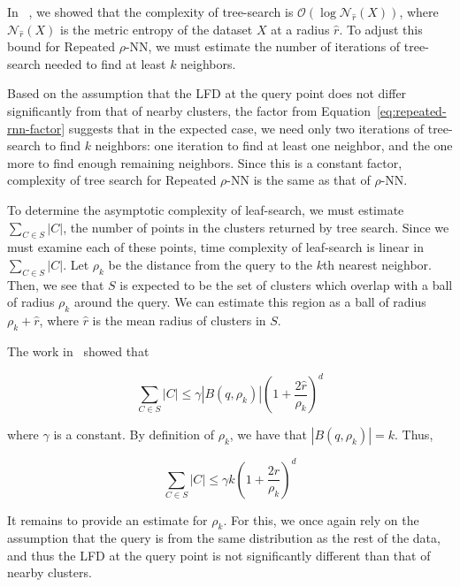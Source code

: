 In ~\cite{ishaq2019clustered}, we showed that the complexity of tree-search is $\mathcal{O}(\log\mathcal{N}_{\hat{r}}(X))$, where $\mathcal{N}_{\hat{r}}(X)$ is the metric entropy of the dataset $X$ at a radius $\hat{r}$.
To adjust this bound for Repeated $\rho$-NN, we must estimate the number of iterations of tree-search needed to find at least $k$ neighbors.

Based on the assumption that the LFD at the query point does not differ significantly from that of nearby clusters, the factor from Equation~\ref{eq:repeated-rnn-factor} suggests that in the expected case, we need only two iterations of tree-search to find $k$ neighbors:
one iteration to find at least one neighbor, and the one more to find enough remaining neighbors.
Since this is a constant factor, complexity of tree search for Repeated $\rho$-NN is the same as that of $\rho$-NN.

To determine the asymptotic complexity of leaf-search, we must estimate $\sum_{C \in S} |C|$, the number of points in the clusters returned by tree search.
Since we must examine each of these points, time complexity of leaf-search is linear in $\sum_{C \in S} |C|$. 
Let $\rho_k$ be the distance from the query to the $k$th nearest neighbor.
Then, we see that $S$ is expected to be the set of clusters which overlap with a ball of radius $\rho_k$ around the query.
We can estimate this region as a ball of radius $\rho_k + \hat{r}$, where $\hat{r}$ is the mean radius of clusters in $S$.

The work in~\cite{yu2015entropy} showed that

\begin{equation*}
    \sum_{C \in S} |C| \leq \gamma  \left| B(q, \rho_k) \right| \left(1+ \frac{2\hat{r}}{\rho_k} \right)^d
\end{equation*}

where $\gamma$ is a constant. 
By definition of $\rho_k$, we have that $|B(q, \rho_k)| = k$.
Thus,

\begin{equation}
    \sum_{C \in S} |C| \leq \gamma k \left( 1+ \frac{2\hat{r}}{\rho_k} \right)^d
    \label{eq:methods:repeated-rnn-leaf-search}
\end{equation}

It remains to provide an estimate for $\rho_k$. 
For this, we once again rely on the assumption that the query is from the same distribution as the rest of the data, and thus the LFD at the query point is not significantly different than that of nearby clusters.

